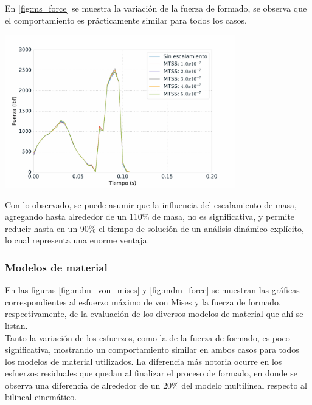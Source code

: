 En \ref{fig:ms_force} se muestra la variación de la fuerza de formado, se observa que el 
comportamiento es prácticamente similar para todos los casos.

\begin{center}
\includegraphics[width=0.75\textwidth]{src/ch4/ms_force.pdf}
\label{fig:ms_force}
\end{center}

Con lo observado, se puede asumir que la influencia del escalamiento de masa, agregando hasta alrededor 
de un 110\% de masa, no es significativa, y permite reducir hasta en un 90\% el tiempo de solución de 
un análisis dinámico-explícito, lo cual representa una enorme ventaja.

\subsubsection{Modelos de material}

En las figuras  \ref{fig:mdm_von_mises} y \ref{fig:mdm_force} se muestran las gráficas correspondientes 
al esfuerzo máximo de von Mises y la fuerza de formado, respectivamente, de la evaluación de los diversos 
modelos de material que ahí se listan.\\

Tanto la variación de los esfuerzos, como la de la fuerza de formado, es poco significativa, mostrando 
un comportamiento similar en ambos casos para todos los modelos de material utilizados. La 
diferencia más notoria ocurre en los esfuerzos residuales que quedan al finalizar el proceso 
de formado, en donde se observa una diferencia de alrededor de un 20\% del modelo multilineal 
respecto al bilineal cinemático.

